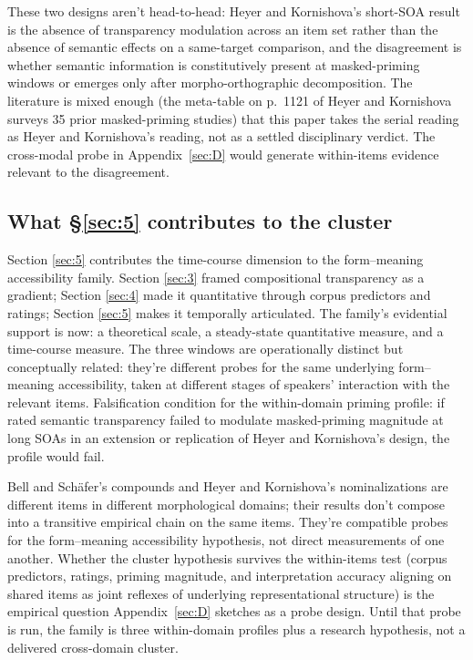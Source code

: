 These two designs aren't head-to-head: Heyer and Kornishova's short-SOA result is the absence of transparency modulation across an item set rather than the absence of semantic effects on a same-target comparison, and the disagreement is whether semantic information is constitutively present at masked-priming windows or emerges only after morpho-orthographic decomposition. The literature is mixed enough (the meta-table on p.~1121 of Heyer and Kornishova surveys 35 prior masked-priming studies) that this paper takes the serial reading as Heyer and Kornishova's reading, not as a settled disciplinary verdict. The cross-modal probe in Appendix~\ref{sec:D} would generate within-items evidence relevant to the disagreement.

\subsection{What §\ref{sec:5} contributes to the cluster}

Section \ref{sec:5} contributes the time-course dimension to the form--meaning accessibility family. Section \ref{sec:3} framed compositional transparency as a gradient; Section \ref{sec:4} made it quantitative through corpus predictors and ratings; Section \ref{sec:5} makes it temporally articulated. The family's evidential support is now: a theoretical scale, a steady-state quantitative measure, and a time-course measure. The three windows are operationally distinct but conceptually related: they're different probes for the same underlying form--meaning accessibility, taken at different stages of speakers' interaction with the relevant items. Falsification condition for the within-domain priming profile: if rated semantic transparency failed to modulate masked-priming magnitude at long SOAs in an extension or replication of Heyer and Kornishova's design, the profile would fail.

Bell and Schäfer's compounds and Heyer and Kornishova's nominalizations are different items in different morphological domains; their results don't compose into a transitive empirical chain on the same items. They're compatible probes for the form--meaning accessibility hypothesis, not direct measurements of one another. Whether the cluster hypothesis survives the within-items test (corpus predictors, ratings, priming magnitude, and interpretation accuracy aligning on shared items as joint reflexes of underlying representational structure) is the empirical question Appendix~\ref{sec:D} sketches as a probe design. Until that probe is run, the family is three within-domain profiles plus a research hypothesis, not a delivered cross-domain cluster.

